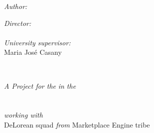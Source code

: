 \documentclass[
11pt, %
oneside, %
english,
singlespacing, %
headsepline, %
]{MastersDoctoralThesis} %
\def \universitysupervisor{Maria José Casany}
\def \tribe{Marketplace Engine tribe}
\def \squad{DeLorean squad}
\begin{document}
\begin{titlepage}
\begin{center}
\begin{minipage}[t]{0.4\textwidth}
\begin{flushleft} \large
\emph{Author:}\\
\authorname %
\end{flushleft}
\end{minipage}
\begin{minipage}[t]{0.4\textwidth}
\begin{flushright} \large
\emph{Director:} \\
\supname %
\\
\emph{University supervisor:} \\
\universitysupervisor
\end{flushright}
\end{minipage}\\[3cm]
 
\vfill

\large \textit{A Project for the}
\large \degreename 
\textit{ in the}\\[0.2cm]
\deptname\\[0.2cm]
\facname\\[0.2cm]
\textit{working with}\\[0.2cm]
\squad
\textit{ from}
\tribe\\
\vfill

{\large {}}\\[4cm] %
 
\vfill
\end{center}
\end{titlepage}

\end{document}

